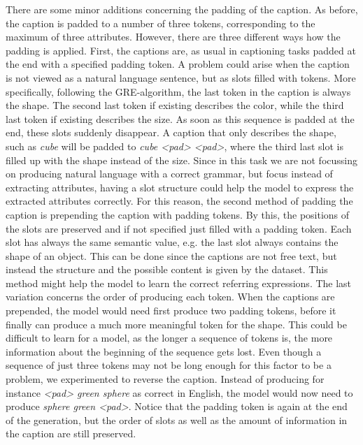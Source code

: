 There are some minor additions concerning the padding of the caption.
As before, the caption is padded to a number of three tokens, corresponding to the maximum of three attributes.
However, there are three different ways how the padding is applied.
First, the captions are, as usual in captioning tasks padded at the end with a specified padding token.
A problem could arise when the caption is not viewed as a natural language sentence, but as slots filled with tokens.
More specifically, following the GRE-algorithm, the last token in the caption is always the shape.
The second last token if existing describes the color, while the third last token if existing describes the size.
As soon as this sequence is padded at the end, these slots suddenly disappear.
A caption that only describes the shape, such as \emph{cube} will be padded to \emph{cube <pad> <pad>}, where the third last slot is filled up with the shape instead of the size.
Since in this task we are not focussing on producing natural language with a correct grammar, but focus instead of extracting attributes, having a slot structure could help the model to express the extracted attributes correctly.
For this reason, the second method of padding the caption is prepending the caption with padding tokens.
By this, the positions of the slots are preserved and if not specified just filled with a padding token.
Each slot has always the same semantic value, e.g. the last slot always contains the shape of an object.
This can be done since the captions are not free text, but instead the structure and the possible content is given by the dataset.
This method might help the model to learn the correct referring expressions.
The last variation concerns the order of producing each token.
When the captions are prepended, the model would need first produce two padding tokens, before it finally can produce a much more meaningful token for the shape.
This could be difficult to learn for a model, as the longer a sequence of tokens is, the more information about the beginning of the sequence gets lost.
Even though a sequence of just three tokens may not be long enough for this factor to be a problem, we experimented to reverse the caption.
Instead of producing for instance \emph{<pad> green sphere} as correct in English, the model would now need to produce \emph{sphere green <pad>}.
Notice that the padding token is again at the end of the generation, but the order of slots as well as the amount of information in the caption are still preserved.

